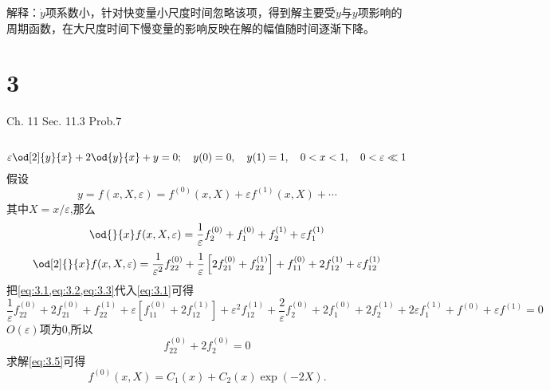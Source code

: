 \documentclass[12pt]{article}
\begin{document}
解释：$\dot{y}$项系数小，针对快变量小尺度时间忽略该项，得到解主要受$\ddot{y}$与$y$项影响的周期函数，在大尺度时间下慢变量的影响反映在解的幅值随时间逐渐下降。


\section{3}
Ch. 11 Sec. 11.3 Prob.7 

\subsection{}

\begin{equation}
	\varepsilon \od[2]{y}{x} +2 \od{y}{x} +y=0 ;\quad y(0) = 0,\quad y(1) = 1, \quad 0<x<1, \quad 0<\varepsilon \ll 1
	\label{eq:3.1}
\end{equation}
假设
\begin{equation}
	y = f(x,X,\varepsilon) = f^{(0)}(x,X) + \varepsilon f^{(1)}(x,X) + \cdots
	\label{eq:3.2}
\end{equation}
其中$X=x/\varepsilon$,那么
\begin{equation}
	\od{}{x} f(x,X,\varepsilon) = \frac{1}{\varepsilon} f^{(0)}_2 + f^{(0)}_1 + f^{(1)}_2 + \varepsilon f^{(1)}_1
	\label{eq:3.3}
\end{equation}
\begin{equation}
	\od[2]{}{x} f(x,X,\varepsilon) = \frac{1}{\varepsilon^2} f^{(0)}_{22} + \frac{1}{\varepsilon} \left[ 2f^{(0)}_{21} + f^{(1)}_{22} \right] + f^{(0)}_{11} + 2 f^{(1)}_{12} + \varepsilon f^{(1)}_{12}
	\label{eq:3.4}
\end{equation}
把\cref{eq:3.1,eq:3.2,eq:3.3}代入\cref{eq:3.1}可得
\begin{equation}
	\frac{1}{\varepsilon} f^{(0)}_{22} + 2f^{(0)}_{21} + f^{(1)}_{22}  + \varepsilon \left[ f^{(0)}_{11} + 2 f^{(1)}_{12} \right] + \varepsilon^2 f^{(1)}_{12} + \frac{2}{\varepsilon} f^{(0)}_2 + 2f^{(0)}_1 + 2f^{(1)}_2 + 2\varepsilon f^{(1)}_1 + f^{(0)} + \varepsilon f^{(1)}= 0
\end{equation}
$O(\varepsilon)$项为$0$,所以
\begin{equation}
	f^{(0)}_{22} + 2f^{(0)}_2 = 0
	\label{eq:3.5}
\end{equation}
求解\cref{eq:3.5}可得
\begin{equation}
	f^{(0)}(x,X) = C_1(x) + C_2(x) \exp{(-2X)}.
	\label{eq:3.6}
\end{equation}
\end{document}
